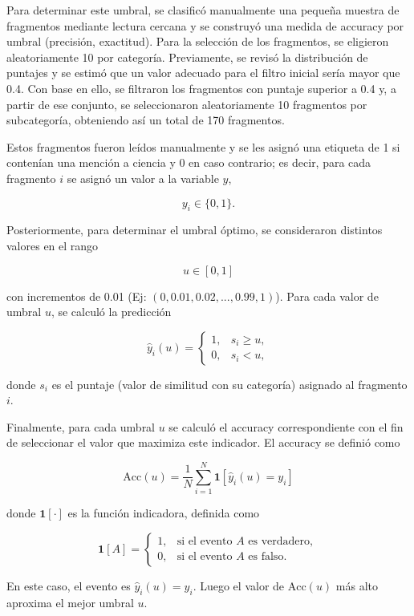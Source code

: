 \documentclass[11pt,a4paper]{article}
\begin{document}
	Para determinar este umbral, se clasificó manualmente una pequeña muestra de fragmentos mediante lectura cercana y se construyó una medida de accuracy por umbral (precisión, exactitud). Para la selección de los fragmentos, se eligieron aleatoriamente 10 por categoría. Previamente, se revisó la distribución de puntajes y se estimó que un valor adecuado para el filtro inicial sería mayor que 0.4. Con base en ello, se filtraron los fragmentos con puntaje superior a 0.4 y, a partir de ese conjunto, se seleccionaron aleatoriamente 10 fragmentos por subcategoría, obteniendo así un total de 170 fragmentos. 
	
	Estos fragmentos fueron leídos manualmente y se les asignó una etiqueta de 1 si contenían una mención a ciencia y 0 en caso contrario; es decir, para cada fragmento $i$ se asignó un valor a la variable $y$,
	
	$$ y_i \in \{0,1\}.$$
	
	Posteriormente, para determinar el umbral óptimo, se consideraron distintos valores en el rango
	
	$$
	u \in [0,1]
	$$
	
	con incrementos de 0.01 (Ej: $(0, 0.01, 0.02,...,0.99, 1)$). Para cada valor de umbral $u$, se calculó la predicción
	
	$$
	\hat{y}_i(u) = 
	\begin{cases}
		1, & s_i \ge u, \\
		0, & s_i < u,
	\end{cases}
	$$
	
	donde $s_i$ es el puntaje (valor de similitud con su categoría) asignado al fragmento $i$.
	
	Finalmente, para cada umbral $u$ se calculó el accuracy correspondiente con el fin de seleccionar el valor que maximiza este indicador. El accuracy se definió como
	
	\begin{equation}
		\mathrm{Acc}(u) = \frac{1}{N} \sum_{i=1}^{N} \mathbf{1}\!\left[\hat{y}_i(u) = y_i\right]
	\end{equation}
	
	donde \(\mathbf{1}[\cdot]\) es la función indicadora, definida como
	
	\[
	\mathbf{1}[A] =
	\begin{cases}
		1, & \text{si el evento } A \text{ es verdadero}, \\
		0, & \text{si el evento } A \text{ es falso}.
	\end{cases}
	\]
	
	En este caso, el evento es \(\hat{y}_i(u) = y_i\). Luego el valor de $\mathrm{Acc}(u)$ más alto aproxima el mejor umbral $u$.
\end{document}
